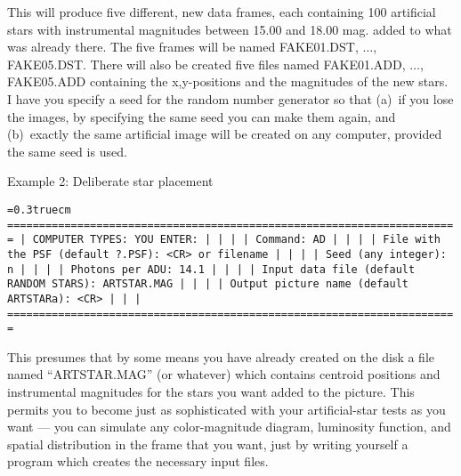 \noindent This will produce five different, new data frames, each
containing 100 artificial stars with instrumental magnitudes between
15.00 and 18.00 mag. added to what was already there.  The five frames
will be named FAKE01.DST, $\ldots$, FAKE05.DST.  There will also be created
five files named FAKE01.ADD, $\ldots$, FAKE05.ADD containing the
x,y-positions and the magnitudes of the new stars.  I have you specify
a seed for the random number generator so that (a)~if you lose the
images, by specifying the same seed you can make them again, and
(b)~exactly the same artificial image will be created on any computer,
provided the same seed is used.

\vfill
\eject

\noindent Example 2:  Deliberate star placement

\bigskip
{\noindent\obeylines\obeyspaces\frenchspacing\tt\baselineskip=0.3truecm
=======================================================================
| COMPUTER TYPES:                                  YOU ENTER:         |
|                                                                     |
| Command:                                         AD                 |
|                                                                     |
|         File with the PSF (default ?.PSF):       <CR> or filename   |
|                                                                     |
|                        Seed (any integer):       n                  |
|                                                                     |
|                           Photons per ADU:       14.1               |
|                                                                     |
|    Input data file (default RANDOM STARS):       ARTSTAR.MAG        |
|                                                                     |
|    Output picture name (default ARTSTARa):       <CR>               |
|                                                                     |
=======================================================================
}
\bigskip

\noindent This presumes that by some means you have already created on
the disk a file named ``ARTSTAR.MAG'' (or whatever) which contains
centroid positions and instrumental magnitudes for the stars you want
added to the picture.  This permits you to become just as sophisticated
with your artificial-star tests as you want --- you can simulate any
color-magnitude diagram, luminosity function, and spatial distribution
in the frame that you want, just by writing yourself a program which
creates the necessary input files.

